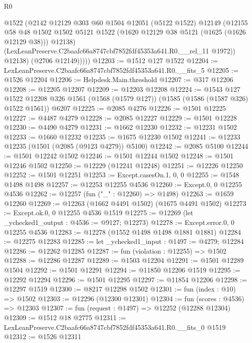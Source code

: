 \begin{lexlean}{R0}
\begin{coremodule}
              @1522
              (@2142
                @12129
                @303
                @60
                @1504
                @12051
                (@5122 @1522)
                @12149
                (@12155
                  @58
                  @48
                  @1502
                  @1502
                  @5121
                  @1522
                  (@1620 @12129 @38 @5121 (@1625 (@1626 @12129 @38)))
                  @12138)
                (LexLeanPreserve.C2baafc66a8747cbf7852fdf45353a641.R0.__rel_11 @1972))
              @12138)
            (@2706 @12149)))))
@12203 := @1512 @127 @1522
@12204 := LexLeanPreserve.C2baafc66a8747cbf7852fdf45353a641.R0.__fits_5
@12205 := @1526 @12204
@12206 := Helpdesk.Main.threshold
@12207 := @317 @12206
@12208 := @12205 @12207
@12209 := @12203 @12208
@12224 := @1543
    @127
    @1522
    @12208
    @326
    @1561
    (@1568 (@1579 @127))
    (@1585 (@1586 (@1587 @326) @1522 @1561))
    @6207
@12225 := @2085 @4276
@12226 := @1501 @12225
@12227 := @4487 @4279
@12228 := @2085 @12227
@12229 := @1501 @12228
@12230 := @4490 @4279
@12231 := @1662 @12230
@12232 := @12231 @1502
@12233 := @1660 @12232
@12235 := @1675 @12230 @1502
@12241 := @12233 @12235 (@1501 (@2085 (@9123 @4279)) @5100)
@12242 := @2085 @5100
@12244 := @1501 @12242 @1502
@12246 := @1501 @12244 @1502
@12248 := @1501 @12246 @1502
@12250 := @12229 (@12241 @12248)
@12251 := @12226 @12250
@12252 := @1501 @12251
@12253 := Except.casesOn.{1, 0, 0}
@12255 := @1548 @1498 @1498
@12257 := @12253 @12255 @4536
@12260 := Except.{0, 0} @12255 @4536
@12262 := @12257 (fun ("_" : @12260) => @1498)
@12263 := @1659 @12260
@12269 := @12263 (@1662 @4491 @1502) (@1675 @4491 @1502)
@12273 := Except.ok.{0, 0} @12255 @4536 @1519
@12275 := @12269 (let _ychecked1_output : @4536 := @9127; @12273)
@12278 := Except.error.{0, 0} @12255 @4536
@12283 := @12278 (@1552 @1498 @1498 @1881 @1881)
@12284 := @12275 @12283
@12285 := let _ychecked1_input : @1497 := @4279; @12284
@12286 := @12262 @12285
@12287 := fun (violation : @12255) => @1502
@12288 := @12286 @12287
@12289 := @1503 @12204
@12291 := @1501 @12289 @1504
@12292 := @1501 @12291
@12294 := @11850 @12206 @1519
@12295 := @12292 @12294
@12296 := @1501 @12295
@12297 := @11854 @12206
@12298 := @12297 @1519
@12300 := @8217 @12298 @1502
@12301 := fun (index : @10) => @1502
@12303 := @12296 (@12300 @12301)
@12304 := fun (scores : @4536) => @12303
@12307 := fun (request : @1497) => @12252 (@12288 @12304)
@12309 := @1512 @18 @2775
@12311 := LexLeanPreserve.C2baafc66a8747cbf7852fdf45353a641.R0.__fits_0 @1519
@12312 := @1526 @12311

\end{coremodule}
\end{lexlean}
